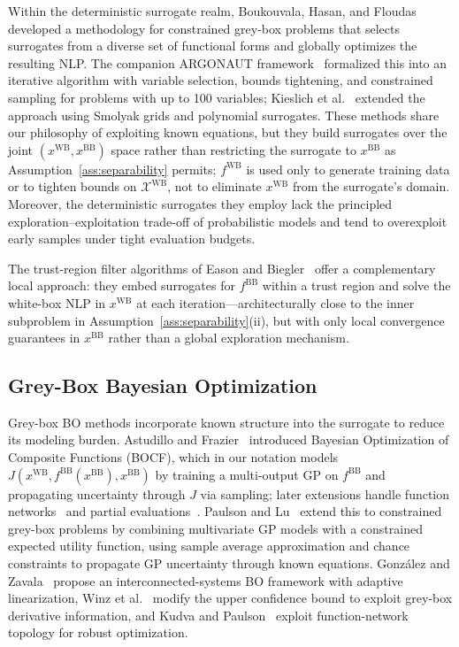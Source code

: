 \documentclass[12pt,a4paper]{article}%
\theoremstyle{plain}%
\theoremstyle{remark}%
\theoremstyle{definition}%
\def\WB{\mathrm{WB}}
\def\BB{\mathrm{BB}}
\begin{document}
Within the deterministic surrogate realm, Boukouvala, Hasan, and Floudas~\cite{boukouvala2017greybox_jgo} developed a methodology for constrained grey-box problems that selects surrogates from a diverse set of functional forms and globally optimizes the resulting NLP. The companion ARGONAUT framework~\cite{boukouvala2017argonaut} formalized this into an iterative algorithm with variable selection, bounds tightening, and constrained sampling for problems with up to 100 variables; Kieslich et al.~\cite{kieslich2018smolyak} extended the approach using Smolyak grids and polynomial surrogates. These methods share our philosophy of exploiting known equations, but they build surrogates over the joint $(x^{\WB}, x^{\BB})$ space rather than restricting the surrogate to $x^{\BB}$ as Assumption~\ref{ass:separability} permits; $f^{\WB}$ is used only to generate training data or to tighten bounds on $\mathcal{X}^{\WB}$, not to eliminate $x^{\WB}$ from the surrogate's domain. Moreover, the deterministic surrogates they employ lack the principled exploration--exploitation trade-off of probabilistic models and tend to overexploit early samples under tight evaluation budgets.

The trust-region filter algorithms of Eason and Biegler~\cite{eason2016trf,eason2018trf} offer a complementary local approach: they embed surrogates for $f^{\BB}$ within a trust region and solve the white-box NLP in $x^{\WB}$ at each iteration---architecturally close to the inner subproblem in Assumption~\ref{ass:separability}(ii), but with only local convergence guarantees in $x^{\BB}$ rather than a global exploration mechanism.

\subsection{Grey-Box Bayesian Optimization}

Grey-box BO methods incorporate known structure into the surrogate to reduce its modeling burden. Astudillo and Frazier~\cite{astudillo2019bocf} introduced Bayesian Optimization of Composite Functions (BOCF), which in our notation models $J(x^{\WB}, f^{\BB}(x^{\BB}), x^{\BB})$ by training a multi-output GP on $f^{\BB}$ and propagating uncertainty through $J$ via sampling; later extensions handle function networks~\cite{astudillo2021bofn} and partial evaluations~\cite{buathong2024partial}. Paulson and Lu~\cite{paulson2022cobalt} extend this to constrained grey-box problems by combining multivariate GP models with a constrained expected utility function, using sample average approximation and chance constraints to propagate GP uncertainty through known equations. Gonz\'{a}lez and Zavala~\cite{gonzalez2024bois} propose an interconnected-systems BO framework with adaptive linearization, Winz et al.~\cite{winz2025greybox} modify the upper confidence bound to exploit grey-box derivative information, and Kudva and Paulson~\cite{kudva2025bonsai} exploit function-network topology for robust optimization.
\end{document}
